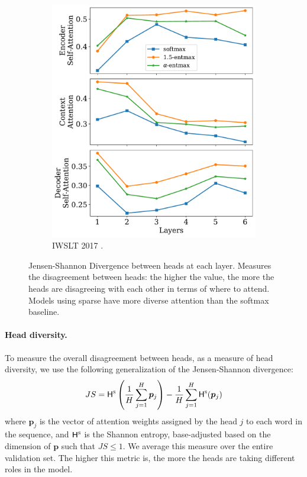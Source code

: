 \begin{figure}[!htbp]
\begin{subfigure}[b]{.49\linewidth}
        \includegraphics[width=\linewidth]{Figures/js_divs_de.pdf}
        \caption{%
            \label{fig:js_divs_de}%
            IWSLT 2017 .}
    \end{subfigure}
    \caption[Jensen-Shannon Divergence between heads at each layer.]{%
        \label{fig:js_divs}
        Jensen-Shannon Divergence between heads at each layer. Measures the
        disagreement between heads: the higher the value, the more the heads
        are disagreeing with each other in terms of where to attend. Models
        using sparse \entmaxtext have more diverse attention than the softmax
        baseline.
    }
\end{figure}

\paragraph*{Head diversity.} To measure the overall disagreement
between heads, as a measure of head diversity, we use the
following generalization of the Jensen-Shannon divergence:
%
\begin{equation}
    JS = \mathsf{H}^{\textsc{s}}\left(\frac{1}{H}\sum_{j=1}^H \bm{p}_{j}\right) -
    \frac{1}{H}\sum_{j=1}^{H}
    \mathsf{H}^{\textsc{s}}(\bm{p}_j)
\end{equation}
%
where $\bm{p}_j$ is the vector of attention weights assigned by the head
$j$ to each word in the sequence, and $\mathsf{H}^{\textsc{s}}$ is the Shannon entropy,
base-adjusted based on the dimension of $\bm{p}$ such that $JS \leq
    1$. We average this measure over the entire validation set. The
higher this metric is, the more the heads are taking different roles
in the model.


